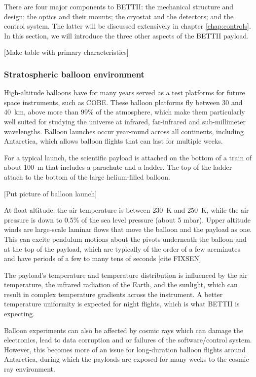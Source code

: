 There are four major components to BETTII: the mechanical structure and design; the optics and their mounts; the cryostat and the detectors; and the control system. The latter will be discussed extensively in chapter \ref{chap:controls}. In this section, we will introduce the three other aspects of the BETTII payload.

[Make table with primary characteristics]

\subsubsection{Stratospheric balloon environment}

High-altitude balloons have for many years served as a test platforms for future space instruments, such as COBE. These balloon platforms fly between 30 and \SI{40}{\kilo\meter}, above more than 99\% of the atmosphere, which make them particularly well suited for studying the universe at infrared, far-infrared and sub-millimeter wavelengths. Balloon launches occur year-round across all continents, including Antarctica, which allows balloon flights that can last for multiple weeks. 

For a typical launch, the scientific payload is attached on the bottom of a train of about \SI{100}{\meter} that includes a parachute and a ladder. The top of the ladder attach to the bottom of the large helium-filled balloon. 

[Put picture of balloon launch]

At float altitude, the air temperature is between \SI{230}{\kelvin} and \SI{250}{\kelvin}, while the air pressure is down to 0.5\% of the sea level pressure (about 5 mbar). Upper altitude winds are large-scale laminar flows that move the balloon and the payload as one. This can excite pendulum motions about the pivots underneath the balloon and at the top of the payload, which are typically of the order of a few arcminutes and have periods of a few to many tens of seconds [cite FIXSEN]

The payload's temperature and temperature distribution is influenced by the air temperature, the infrared radiation of the Earth, and the sunlight, which can result in complex temperature gradients across the instrument. A better temperature uniformity is expected for night flights, which is what BETTII is expecting.

Balloon experiments can also be affected by cosmic rays which can damage the electronics, lead to data corruption and or failures of the software/control system. However, this becomes more of an issue for long-duration balloon flights around Antarctica, during which the payloads are exposed for many weeks to the cosmic ray environment.

